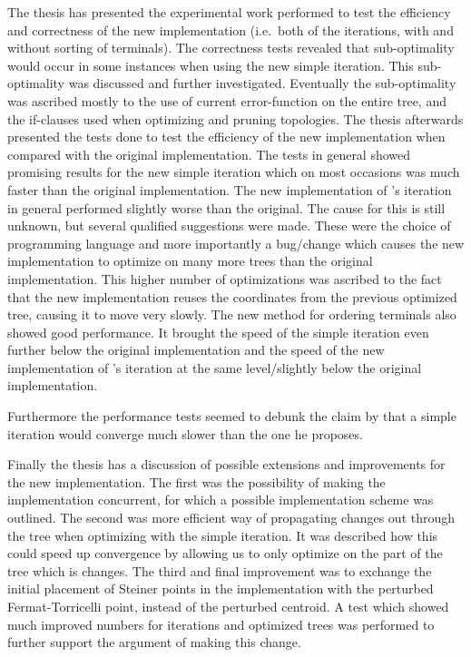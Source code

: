 The thesis has presented the experimental work performed to test the efficiency
and correctness of the new implementation (i.e.\ both of the iterations, with
and without sorting of terminals). The correctness tests revealed that
sub-optimality would occur in some instances when using the new simple
iteration. This sub-optimality was discussed and further investigated.
Eventually the sub-optimality was ascribed mostly to the use of current
error-function on the entire tree, and the if-clauses used when optimizing and
pruning topologies. The thesis afterwards presented the tests done to test the
efficiency of the new implementation when compared with the original
implementation. The tests in general showed promising results for the new simple
iteration which on most occasions was much faster than the original
implementation. The new implementation of \citeauthor{smith1992}'s iteration in
general performed slightly worse than the original. The cause for this is still
unknown, but several qualified suggestions were made. These were the choice of
programming language and more importantly a bug/change which causes the new
implementation to optimize on many more trees than the original implementation.
This higher number of optimizations was ascribed to the fact that the new
implementation reuses the coordinates from the previous optimized tree, causing
it to move very slowly. The new method for ordering terminals also showed good
performance. It brought the speed of the simple iteration even further
below the original implementation and the speed of the new implementation of
\citeauthor{smith1992}'s iteration at the same level/slightly below the original
implementation.

Furthermore the performance tests seemed to debunk the claim by
\textcite{smith1992} that a simple iteration would converge much slower than the
one he proposes.

Finally the thesis has a discussion of possible extensions and improvements for
the new implementation. The first was the possibility of making the
implementation concurrent, for which a possible implementation scheme was
outlined. The second was more efficient way of propagating changes out through
the tree when optimizing with the simple iteration. It was described how this
could speed up convergence by allowing us to only optimize on the part of the
tree which is changes. The third and final improvement was to exchange the
initial placement of Steiner points in the implementation with the perturbed
Fermat-Torricelli point, instead of the perturbed centroid. A test which showed
much improved numbers for iterations and optimized trees was performed to
further support the argument of making this change.

